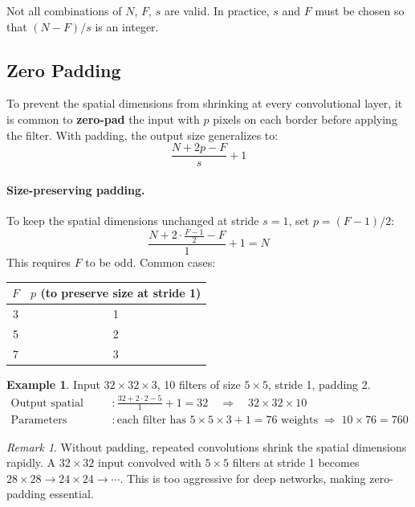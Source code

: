\documentclass[11pt,a4paper]{article}
\theoremstyle{definition}
\newtheorem{example}{Example}[section]
\theoremstyle{plain}
\theoremstyle{remark}
\newtheorem*{remark}{Remark}
\begin{document}
Not all combinations of $N$, $F$, $s$ are valid. In practice, $s$ and $F$ must be chosen so that $(N - F)/s$ is an integer.

\subsection{Zero Padding}

To prevent the spatial dimensions from shrinking at every convolutional layer, it is common to \textbf{zero-pad} the input with $p$ pixels on each border before applying the filter. With padding, the output size generalizes to:
\[
    \frac{N + 2p - F}{s} + 1
\]

\paragraph{Size-preserving padding.}
To keep the spatial dimensions unchanged at stride $s = 1$, set $p = (F-1)/2$:
\[
    \frac{N + 2 \cdot \frac{F-1}{2} - F}{1} + 1 = N
\]
This requires $F$ to be odd. Common cases:
\begin{center}
\begin{tabular}{cc}
    \hline
    $F$ & $p$ (to preserve size at stride 1) \\
    \hline
    3   & 1 \\
    5   & 2 \\
    7   & 3 \\
    \hline
\end{tabular}
\end{center}

\begin{example}
Input $32 \times 32 \times 3$, 10 filters of size $5 \times 5$, stride 1, padding 2.
\begin{align*}
    \text{Output spatial size} &: \frac{32 + 2 \cdot 2 - 5}{1} + 1 = 32 \quad \Rightarrow \quad 32 \times 32 \times 10 \\
    \text{Parameters} &: \text{each filter has } 5 \times 5 \times 3 + 1 = 76 \text{ weights} \;\Rightarrow\; 10 \times 76 = 760
\end{align*}
\end{example}

\begin{remark}
Without padding, repeated convolutions shrink the spatial dimensions rapidly. A $32 \times 32$ input convolved with $5 \times 5$ filters at stride 1 becomes $28 \times 28 \to 24 \times 24 \to \cdots$. This is too aggressive for deep networks, making zero-padding essential.
\end{remark}
\end{document}
